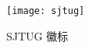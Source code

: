 \documentclass{ctexart}
\begin{document}
\begin{figure}[ht]
    \centering
    \texttt{[image: sjtug]}
    \caption{SJTUG 徽标}
\end{figure}
\end{document}
